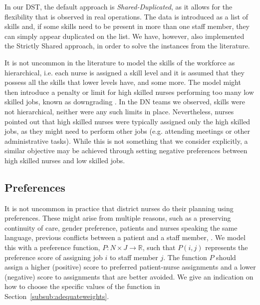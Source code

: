 \documentclass[a4paper,11pt,authoryear]{elsarticle}
\begin{document}
\noindent In our DST, the default approach is \emph{Shared-Duplicated}, as it allows for the flexibility that is observed in real operations. The data is introduced as a list of skills and, if some skills need to be present in more than one staff member, they can simply appear duplicated on the list. We have, however, also implemented the Strictly Shared approach, in order to solve the instances from the literature.

It is not uncommon in the literature to model the skills of the workforce as hierarchical, i.e. each nurse is assigned a skill level and it is assumed that they possess all the skills that lower levels have, and some more. The model might then introduce a penalty or limit for high skilled nurses performing too many low skilled jobs, known as downgrading \cite[see, for example,][]{fikar2015}. In the DN teams we observed, skills were not hierarchical, neither were any such limits in place. Nevertheless, nurses pointed out that high skilled nurses were typically assigned only the high skilled jobs, as they might need to perform other jobs (e.g. attending meetings or other administrative tasks). While this is not something that we consider explicitly, a similar objective may be achieved through setting negative preferences between high skilled nurses and low skilled jobs.

\subsection{Preferences}
\label{sub:preferences}
\noindent It is not uncommon in practice that district nurses do their planning using preferences. These might arise from multiple reasons, such as a preserving continuity of care, gender preference, patients and nurses speaking the same language, previous conflicts between a patient and a staff member, . We model this with a preference function, $P: N\times J \rightarrow \mathbb{R}$, such that $P(i,j)$ represents the preference score of assigning job $i$ to staff member $j$. The function $P$ should assign a higher (positive) score to preferred patient-nurse assignments and a lower (negative) score to assignments that are better avoided. We give an indication on how to choose the specific values of the function in Section~\ref{subsub:adequateweights}.

\end{document}
